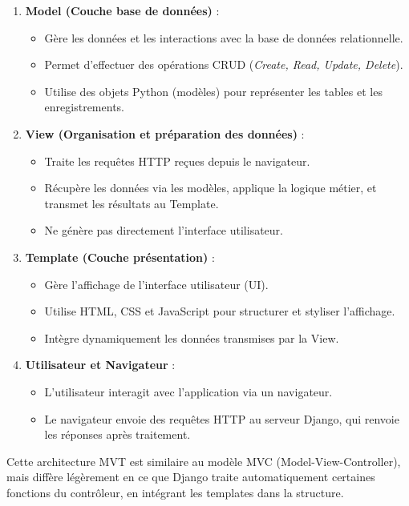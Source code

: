 \begin{enumerate}
    \item \textbf{Model (Couche base de données)} :
    \begin{itemize}
        \item Gère les données et les interactions avec la base de données relationnelle.
        \item Permet d’effectuer des opérations CRUD (\textit{Create, Read, Update, Delete}).
        \item Utilise des objets Python (modèles) pour représenter les tables et les enregistrements.
    \end{itemize}
    
    \item \textbf{View (Organisation et préparation des données)} :
    \begin{itemize}
        \item Traite les requêtes HTTP reçues depuis le navigateur.
        \item Récupère les données via les modèles, applique la logique métier, et transmet les résultats au Template.
        \item Ne génère pas directement l’interface utilisateur.
    \end{itemize}
    
    \item \textbf{Template (Couche présentation)} :
    \begin{itemize}
        \item Gère l’affichage de l’interface utilisateur (UI).
        \item Utilise HTML, CSS et JavaScript pour structurer et styliser l'affichage.
        \item Intègre dynamiquement les données transmises par la View.
    \end{itemize}
    
    \item \textbf{Utilisateur et Navigateur} :
    \begin{itemize}
        \item L’utilisateur interagit avec l’application via un navigateur.
        \item Le navigateur envoie des requêtes HTTP au serveur Django, qui renvoie les réponses après traitement.
    \end{itemize}
\end{enumerate}
\medskip

\noindent
Cette architecture MVT est similaire au modèle MVC (Model-View-Controller), mais diffère légèrement en ce que Django traite automatiquement certaines fonctions du contrôleur, en intégrant les templates dans la structure. 
